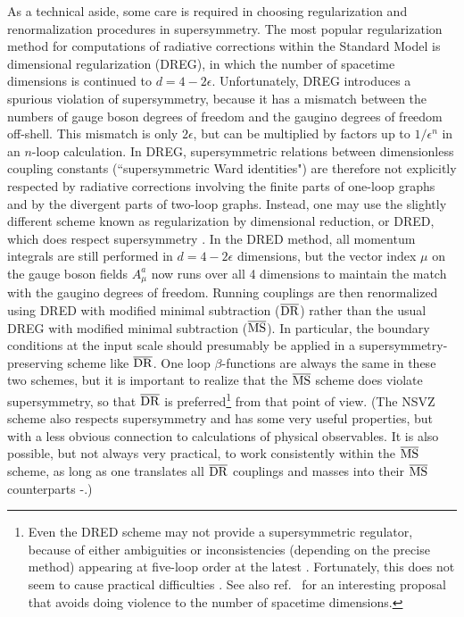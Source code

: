 \documentclass[12pt]{article}
\def\drbar{\overline{\rm DR}}
\def\msbar{\overline{\rm MS}}
\begin{document}
As a technical aside, some care is required in choosing
regularization and renormalization procedures in supersymmetry.
The most popular regularization method for computations of radiative
corrections within the Standard Model is dimensional regularization
(DREG), in which the number of spacetime dimensions is continued to
$d=4-2\epsilon$. Unfortunately, DREG introduces a spurious violation of
supersymmetry, because it has a mismatch between the numbers of gauge
boson degrees of freedom and the gaugino degrees of freedom off-shell.
This mismatch is only $2\epsilon$, but can be multiplied by factors up to
$1/\epsilon^n$ in an $n$-loop calculation. In DREG, supersymmetric
relations between dimensionless coupling constants (``supersymmetric Ward
identities") are therefore not explicitly respected by radiative
corrections involving the finite parts of one-loop graphs and by the
divergent parts of two-loop graphs.  Instead, one may use the slightly
different scheme known as regularization by dimensional reduction, or
DRED, which does respect supersymmetry \cite{DRED}. In the DRED method,
all momentum integrals are still performed in $d=4-2\epsilon$ dimensions,
but the vector index $\mu$ on the gauge boson fields $A^a_\mu$ now runs
over all 4 dimensions to maintain the match with the gaugino degrees of
freedom. Running couplings are then renormalized using DRED with modified
minimal subtraction ($\drbar$) rather than the usual DREG with modified
minimal subtraction ($\msbar$). In particular, the boundary conditions at
the input scale should presumably be applied in a supersymmetry-preserving
scheme like $\drbar$.  One loop $\beta$-functions are always the same in
these two schemes, but it is important to realize that the $\msbar$ scheme
does violate supersymmetry, so that $\drbar$ is preferred\footnote{Even
the DRED scheme may not provide a supersymmetric regulator, because of
either ambiguities or inconsistencies (depending on the precise method)
appearing at five-loop order at the latest \cite{DREDdies}. Fortunately,
this does not seem to cause practical difficulties
\cite{JJperspective,Stockinger}. See also ref.~\cite{Woodard} for an 
interesting proposal that avoids doing violence to the number of spacetime
dimensions.} from that point of view. (The NSVZ scheme \cite{Shifman} also
respects supersymmetry and has some very useful properties, but with a
less obvious connection to calculations of physical observables. It is
also possible, but not always very practical, to work consistently within
the $\overline{\rm MS}$ scheme, as long as one translates all
$\overline{\rm DR}$ couplings and masses into their $\overline{\rm MS}$
counterparts 
\cite{mstodrone}-\cite{mstodrmore}.)
\end{document}
